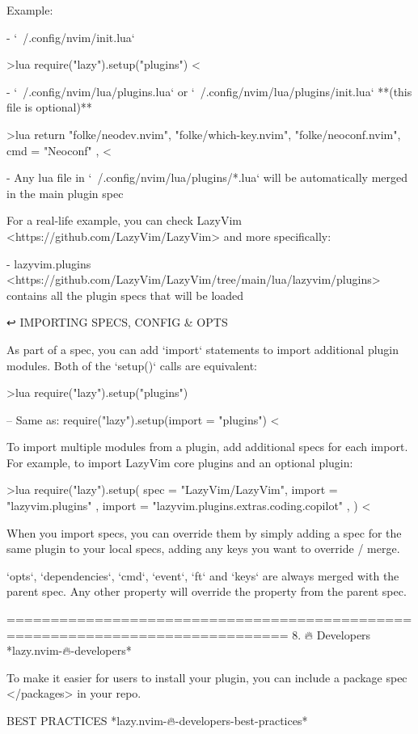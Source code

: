 \begin{listing}
Example:

- `~/.config/nvim/init.lua`

>lua
    require("lazy").setup("plugins")
<

- `~/.config/nvim/lua/plugins.lua` or `~/.config/nvim/lua/plugins/init.lua` **(this file is optional)**

>lua
return {
"folke/neodev.nvim",
"folke/which-key.nvim",
{ "folke/neoconf.nvim", cmd = "Neoconf" },
}
<

- Any lua file in `~/.config/nvim/lua/plugins/*.lua` will be automatically merged in the main plugin spec

For a real-life example, you can check LazyVim
<https://github.com/LazyVim/LazyVim> and more specifically:

- lazyvim.plugins <https://github.com/LazyVim/LazyVim/tree/main/lua/lazyvim/plugins> contains all the plugin specs that will be loaded


↩️ IMPORTING SPECS, CONFIG & OPTS

As part of a spec, you can add `import` statements to import additional plugin
modules. Both of the `setup()` calls are equivalent:

>lua
require("lazy").setup("plugins")

-- Same as:
require("lazy").setup({{import = "plugins"}})
<

To import multiple modules from a plugin, add additional specs for each import.
For example, to import LazyVim core plugins and an optional plugin:

>lua
require("lazy").setup({
spec = {
{ "LazyVim/LazyVim", import = "lazyvim.plugins" },
{ import = "lazyvim.plugins.extras.coding.copilot" },
}
})
<

When you import specs, you can override them by simply adding a spec for the
same plugin to your local specs, adding any keys you want to override / merge.

`opts`, `dependencies`, `cmd`, `event`, `ft` and `keys` are always merged with
the parent spec. Any other property will override the property from the parent
spec.


==============================================================================
8. 🔥 Developers                                 *lazy.nvim-🔥-developers*

To make it easier for users to install your plugin, you can include a package
spec </packages> in your repo.


BEST PRACTICES                      *lazy.nvim-🔥-developers-best-practices*


\end{listing}
